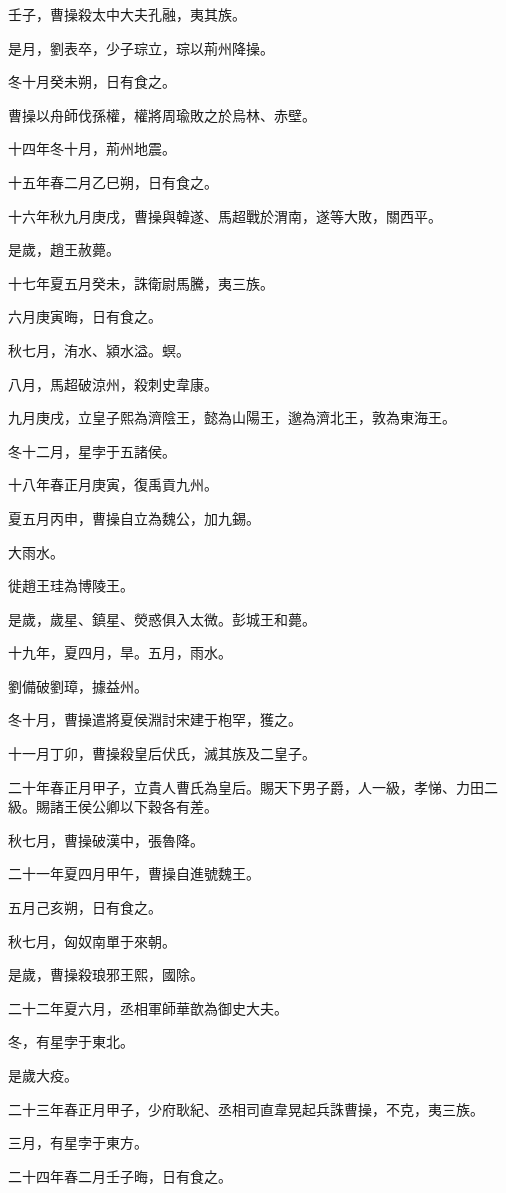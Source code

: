 \begin{pinyinscope}
壬子，曹操殺太中大夫孔融，夷其族。

是月，劉表卒，少子琮立，琮以荊州降操。

冬十月癸未朔，日有食之。

曹操以舟師伐孫權，權將周瑜敗之於烏林、赤壁。

十四年冬十月，荊州地震。

十五年春二月乙巳朔，日有食之。

十六年秋九月庚戌，曹操與韓遂、馬超戰於渭南，遂等大敗，關西平。

是歲，趙王赦薨。

十七年夏五月癸未，誅衛尉馬騰，夷三族。

六月庚寅晦，日有食之。

秋七月，洧水、潁水溢。螟。

八月，馬超破涼州，殺刺史韋康。

九月庚戌，立皇子熙為濟陰王，懿為山陽王，邈為濟北王，敦為東海王。

冬十二月，星孛于五諸侯。

十八年春正月庚寅，復禹貢九州。

夏五月丙申，曹操自立為魏公，加九錫。

大雨水。

徙趙王珪為博陵王。

是歲，歲星、鎮星、熒惑俱入太微。彭城王和薨。

十九年，夏四月，旱。五月，雨水。

劉備破劉璋，據益州。

冬十月，曹操遣將夏侯淵討宋建于枹罕，獲之。

十一月丁卯，曹操殺皇后伏氏，滅其族及二皇子。

二十年春正月甲子，立貴人曹氏為皇后。賜天下男子爵，人一級，孝悌、力田二級。賜諸王侯公卿以下穀各有差。

秋七月，曹操破漢中，張魯降。

二十一年夏四月甲午，曹操自進號魏王。

五月己亥朔，日有食之。

秋七月，匈奴南單于來朝。

是歲，曹操殺琅邪王熙，國除。

二十二年夏六月，丞相軍師華歆為御史大夫。

冬，有星孛于東北。

是歲大疫。

二十三年春正月甲子，少府耿紀、丞相司直韋晃起兵誅曹操，不克，夷三族。

三月，有星孛于東方。

二十四年春二月壬子晦，日有食之。


\end{pinyinscope}
